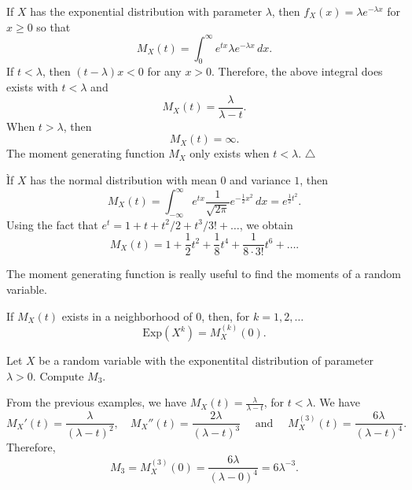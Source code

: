 \begin{example}
If $X$ has the exponential distribution with parameter $\lambda$, then $f_X (x) = \lambda e^{-\lambda x}$ for $x \geq 0$ so that
    \[
        M_X (t) = \int_0^\infty e^{tx} \lambda e^{-\lambda x} \, dx .
    \]
If $t < \lambda$, then $(t - \lambda ) x < 0$ for any $x > 0$. Therefore, the above integral does exists with $t < \lambda$ and
    \[
        M_X (t) = \frac{\lambda}{\lambda - t} .
    \]
When $t > \lambda$, then
    \[
        M_X (t) = \infty .
    \] 
The moment generating function $M_X$ only exists when $t < \lambda$. \hfill $\triangle$
\end{example}

\begin{example}
Ìf $X$ has the normal distribution with mean $0$ and variance $1$, then
    \[
        M_X (t) = \int_{-\infty}^\infty e^{tx} \frac{1}{\sqrt{2\pi}} e^{-\frac{1}{2} x^2} \, dx = e^{\frac{1}{2} t^2} .
    \]
Using the fact that $e^t = 1 + t + t^2/2 + t^3/3! + \ldots$, we obtain
    \[
        M_X (t) = 1 + \frac{1}{2} t^2 + \frac{1}{8} t^4 + \frac{1}{8 \cdot 3!} t^6 + \ldots . \tag*{$\triangle$} 
    \]
\end{example}

The moment generating function is really useful to find the moments of a random variable.

\begin{theorem}\label{T:MomentsAndMomentGeneratingFunction}
If $M_X (t)$ exists in a neighborhood of $0$, then, for $k = 1 , 2 , \ldots$
    \[
        \mathrm{Exp} (X^k) = M_X^{(k)} (0).
    \]
\end{theorem}

\begin{example}
Let $X$ be a random variable with the exponentital distribution of parameter $\lambda >0$. Compute $M_3$. 
\end{example}

\begin{sol*}
From the previous examples, we have $M_X (t) = \frac{\lambda}{\lambda - t}$, for $t < \lambda$. We have
    \[
        M_X'(t) = \frac{\lambda}{(\lambda-t)^2}, \quad M_X'' (t) = \frac{2 \lambda}{(\lambda - t)^3} \quad \text{ and } \quad M_X^{(3)} (t) = \frac{6\lambda}{(\lambda - t)^4} .
    \]
Therefore, 
    \[
        M_3 = M_X^{(3)} (0) = \frac{6\lambda}{(\lambda - 0)^4} = 6 \lambda^{-3} . \tag*{$\triangle$}
    \]
\end{sol*}

